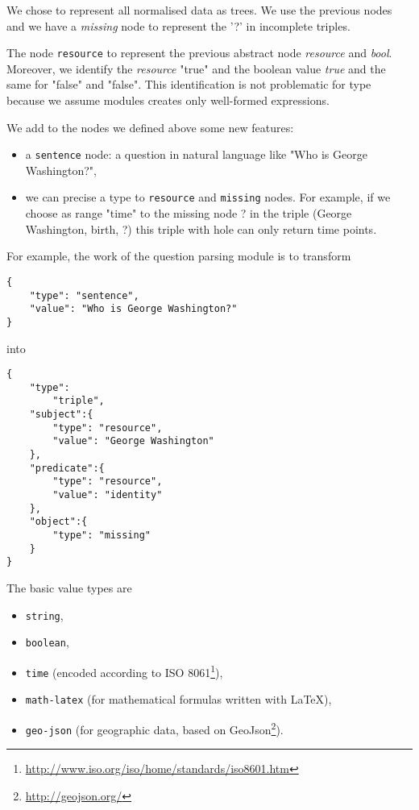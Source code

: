 We chose to represent all normalised data as trees. We use the previous nodes and we have a \textsl{missing} node to represent the '?' in incomplete triples.

The node \texttt{resource} to represent the previous abstract node \textsl{resource} and \textsl{bool}. Moreover, we identify the \textsl{resource} "true" and the boolean value \textsl{true} and the same for "false" and "false". This identification is not problematic for type because we assume modules creates only well-formed expressions.

We add to the nodes we defined above some new features:
\begin{itemize}
    \item a \texttt{sentence} node: a question in natural language like "Who is George Washington?",
    \item we can precise a type to \texttt{resource} and \texttt{missing} nodes. For example, if we choose as range "time" to the missing node ? in the triple (George Washington, birth, ?) this triple with hole can only return time points.
\end{itemize}

For example, the work of the question parsing module is to transform 
\begin{verbatim}
{
    "type": "sentence", 
    "value": "Who is George Washington?"
}
\end{verbatim}
into 
\begin{verbatim}
{
    "type":
        "triple",
    "subject":{
        "type": "resource",
        "value": "George Washington"
    },
    "predicate":{
        "type": "resource",
        "value": "identity"
    },
    "object":{
        "type": "missing"
    }
}
\end{verbatim}

The basic value types are 
\begin{itemize}
    \item \texttt{string},
    \item \texttt{boolean},
    \item \texttt{time} (encoded according to ISO 8061\footnote{\url{http://www.iso.org/iso/home/standards/iso8601.htm}}),
    \item \texttt{math-latex} (for mathematical formulas written with \LaTeX),
    \item \texttt{geo-json} (for geographic data, based on GeoJson\footnote{\url{http://geojson.org/}}).
\end{itemize}

